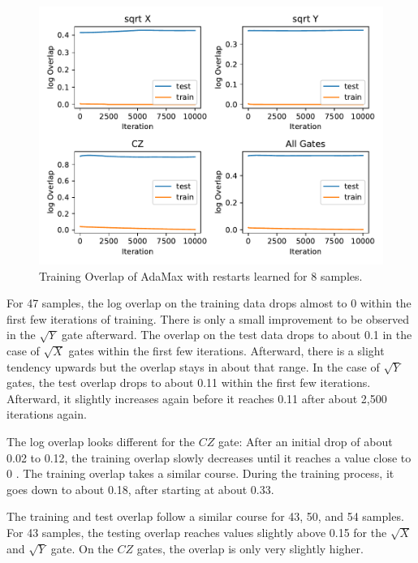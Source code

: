 \begin{figure}[H]
  \centering
  \includegraphics[width=\textwidth]{figures/results/AM-restarts-learned/avgOverlap_8.pdf}
  \caption[Training and Testing Overlaps for AdaMax with Random Restarts and $CZ$ Gates Learned - 8 Samples]{Training 
  Overlap of AdaMax with restarts learned for 8 samples.}
  \label{fig:am_overlap_8}
\end{figure}

For 47 samples, the log overlap on the training data drops almost to 0 within the first few iterations 
of training. There is only a small improvement to be observed in the $\sqrt{Y}$ gate afterward. 
The overlap on the test data drops to about 0.1 in the case of $\sqrt{X}$ gates within the first few iterations.
Afterward, there is a slight tendency upwards but the overlap stays in about that range. In the case 
of $\sqrt{Y}$ gates, the test overlap drops to about 0.11 within the first few iterations. Afterward, 
it slightly increases again before it reaches 0.11 after about 2,500 iterations again.

The log overlap looks different for the $CZ$ gate: After an initial drop of about 0.02 to 0.12, the 
training overlap slowly decreases until it reaches a value close to 0 . The 
training overlap takes a similar course. During the training process, it goes down to about 0.18, after 
starting at about 0.33.

The training and test overlap follow a similar course for 43, 50, and 54 samples. For 43 samples, the 
testing overlap reaches values slightly above 0.15 for the $\sqrt{X}$ and $\sqrt{Y}$ gate. On the $CZ$ gates, 
the overlap is only very slightly higher.

